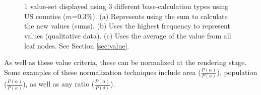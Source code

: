 \begin{figure}[t]
\centering
{}\\
\\
\caption{ 1 value-set displayed using 3 different base-calculation types using US counties ($m$=0.3\%). (a) Represents using the sum to calculate the new values (sums). (b) Uses the highest frequency to represent values (qualitative data). (c) Uses the average of the value from all leaf nodes.  See Section \ref{sec:value}. } \label{fig:valueCalc} \vspace{-0.2cm}
\end{figure}

As well as these value criteria, these can be normalized at the rendering stage. Some examples of these normalization techniques include area ($\frac{P(\alpha)}{P(a)}$), population ($\frac{P(\alpha)}{P(\kappa)}$), as well as any ratio ($\frac{P(\alpha)}{P(\delta)}$).


